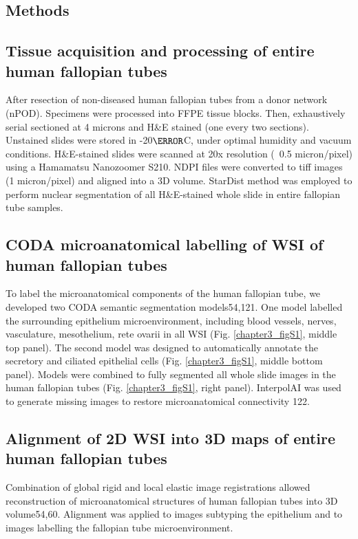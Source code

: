 \begin{refsection}
    \clearpage 
    
    \section{Methods}
    \subsection{Tissue acquisition and processing of entire human fallopian tubes}
    After resection of non-diseased human fallopian tubes from a donor network (nPOD). Specimens were processed into FFPE tissue blocks. Then, exhaustively serial sectioned at 4 microns and H\&E stained (one every two sections). Unstained slides were stored in -20$\degree$C, under optimal humidity and vacuum conditions. 
    H\&E-stained slides were scanned at 20x resolution (~0.5 micron/pixel) using a Hamamatsu Nanozoomer S210. NDPI files were converted to tiff images (1 micron/pixel) and aligned into a 3D volume. StarDist method was employed to perform nuclear segmentation of all H\&E-stained whole slide in entire fallopian tube samples. 
    
    \subsection{CODA microanatomical labelling of WSI of human fallopian tubes}
    To label the microanatomical components of the human fallopian tube, we developed two CODA semantic segmentation models\cite{Kiemen2022CODA,Matos2025CODAvision}54,121. One model labelled the surrounding epithelium microenvironment, including blood vessels, nerves, vasculature, mesothelium, rete ovarii in all WSI (Fig. \ref{chapter3_figS1}, middle top panel). The second model was designed to automatically annotate the secretory and ciliated epithelial cells (Fig. \ref{chapter3_figS1}, middle bottom panel). Models were combined to fully segmented all whole slide images in the human fallopian tubes (Fig. \ref{chapter3_figS1}, right panel). InterpolAI was used to generate missing images to restore microanatomical connectivity \cite{SaurabhInterpolAI}122.
    
    \subsection{Alignment of 2D WSI into 3D maps of entire human fallopian tubes}
    Combination of global rigid and local elastic image registrations allowed reconstruction of microanatomical structures of human fallopian tubes into 3D volume\cite{Kiemen2022CODA,Forjaz2025PIVOT}54,60. Alignment was applied to images subtyping the epithelium and to images labelling the fallopian tube microenvironment. 
    

\end{refsection}
